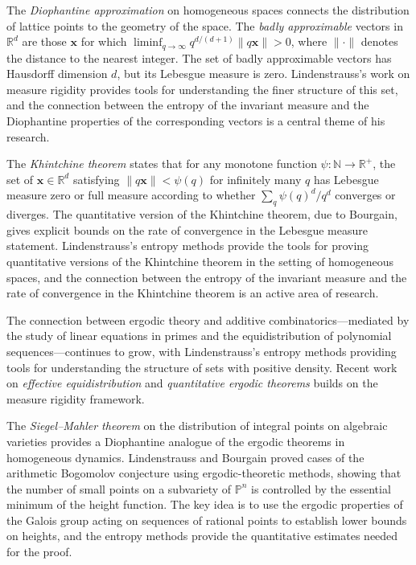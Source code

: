 The \emph{Diophantine approximation} on homogeneous spaces connects the distribution of lattice points to the geometry of the space. The \emph{badly approximable} vectors in $\mathbb{R}^d$ are those $\mathbf{x}$ for which $\liminf_{q \to \infty} q^{d/(d+1)} \|q \mathbf{x}\| > 0$, where $\|\cdot\|$ denotes the distance to the nearest integer. The set of badly approximable vectors has Hausdorff dimension $d$, but its Lebesgue measure is zero. Lindenstrauss's work on measure rigidity provides tools for understanding the finer structure of this set, and the connection between the entropy of the invariant measure and the Diophantine properties of the corresponding vectors is a central theme of his research.

The \emph{Khintchine theorem} states that for any monotone function $\psi: \mathbb{N} \to \mathbb{R}^+$, the set of $\mathbf{x} \in \mathbb{R}^d$ satisfying $\|q \mathbf{x}\| < \psi(q)$ for infinitely many $q$ has Lebesgue measure zero or full measure according to whether $\sum_q \psi(q)^d / q^d$ converges or diverges. The quantitative version of the Khintchine theorem, due to Bourgain, gives explicit bounds on the rate of convergence in the Lebesgue measure statement. Lindenstrauss's entropy methods provide the tools for proving quantitative versions of the Khintchine theorem in the setting of homogeneous spaces, and the connection between the entropy of the invariant measure and the rate of convergence in the Khintchine theorem is an active area of research.

The connection between ergodic theory and additive combinatorics---mediated by the study of linear equations in primes and the equidistribution of polynomial sequences---continues to grow, with Lindenstrauss's entropy methods providing tools for understanding the structure of sets with positive density. Recent work on \emph{effective equidistribution} and \emph{quantitative ergodic theorems} builds on the measure rigidity framework.

The \emph{Siegel--Mahler theorem} on the distribution of integral points on algebraic varieties provides a Diophantine analogue of the ergodic theorems in homogeneous dynamics. Lindenstrauss and Bourgain proved cases of the arithmetic Bogomolov conjecture using ergodic-theoretic methods, showing that the number of small points on a subvariety of $\mathbb{P}^n$ is controlled by the essential minimum of the height function. The key idea is to use the ergodic properties of the Galois group acting on sequences of rational points to establish lower bounds on heights, and the entropy methods provide the quantitative estimates needed for the proof.

